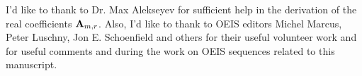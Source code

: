 I'd like to thank to Dr. Max Alekseyev for sufficient help in the derivation of the real coefficients ${\mathbf{A}} \sb{m,r}$.
Also, I'd like to thank to OEIS editors Michel Marcus, Peter Luschny, Jon E. Schoenfield and others
for their useful volunteer work and for useful comments and during the
work on OEIS sequences related to this manuscript.
